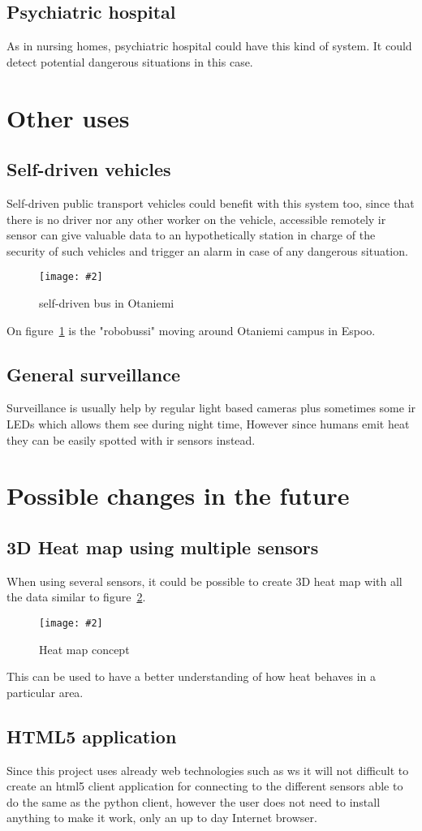 \documentclass[hidelinks,11pt,a4paper,oneside,article]{memoir}
\newcommand{\putimage}[3][10] %
{
\begin{figure}[h]
	\centering
	\captionsetup{justification=centering}
	\texttt{[image: \#2]}
	\caption{#3}
	\label{fig:#2}
\end{figure}
}
\begin{document}
\subsection{Psychiatric hospital}
As in nursing homes, psychiatric hospital could have this kind of system. It could detect potential dangerous situations in this case.

\section{Other uses}
\subsection{Self-driven vehicles}
Self-driven public transport vehicles could benefit with this system too, since that there is no driver nor any other worker on the vehicle, accessible remotely \gls{ir} sensor can give valuable data to an hypothetically station in charge of the security of such vehicles and trigger an alarm in case of any dangerous situation.
    \putimage{robo-bussi}{self-driven bus in Otaniemi}
On figure~\ref{fig:robo-bussi} is the "robobussi" moving around Otaniemi campus in Espoo.

\subsection{General surveillance}
Surveillance is usually help by regular light based cameras plus sometimes some \gls{ir} LEDs which allows them see during night time, However since humans emit heat they can be easily spotted with \gls{ir} sensors instead.

\section{Possible changes in the future}
\subsection{3D Heat map using multiple sensors}
When using several sensors, it could be possible to create 3D heat map with all the data similar to figure~\ref{fig:heatmap}.

    \putimage[10]{heatmap}{Heat map concept}
    
This can be used to have a better understanding of how heat behaves in a particular area.

\subsection{HTML5 application}
Since this project uses already web technologies such as \gls{ws} it will not difficult to create an \gls{html}5 client application for connecting to the different sensors able to do the same as the python client, however the user does not need to install anything to make it work, only an up to day Internet browser.
\end{document}
